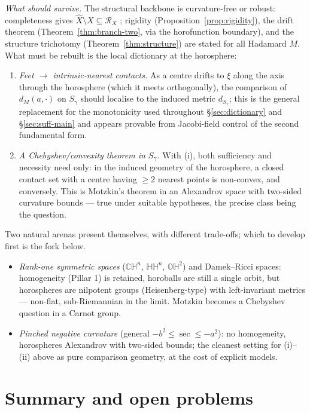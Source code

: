 \documentclass[11pt]{article}
\theoremstyle{remark}
\newcommand{\X}{X}
\newcommand{\Xhat}{\widehat{\X}}
\newcommand{\Rx}{\mathcal{R}_{\X}}
\begin{document}
\emph{What should survive.} The structural backbone is curvature-free
or robust: completeness gives $\Xhat\setminus\X\subseteq\Rx$
\cite[Thm.~3.1]{R1}; rigidity (Proposition~\ref{prop:rigidity}),
the drift theorem (Theorem~\ref{thm:branch-two}, via the horofunction
boundary), and the structure trichotomy
(Theorem~\ref{thm:structure}) are stated for all Hadamard $M$. What
must be rebuilt is the local dictionary at the horosphere:
\begin{enumerate}[label=(\roman*)]
\item \emph{Feet $\to$ intrinsic-nearest contacts.} As a centre drifts
to $\xi$ along the axis through the horosphere (which it meets
orthogonally), the comparison of $d_{M}(a,\cdot)$ on $S_{\gamma}$
should localise to the induced metric $d_{S_{\gamma}}$; this is the
general replacement for the monotonicity used throughout
\S\ref{sec:dictionary} and \S\ref{sec:suff-main} and appears provable from
Jacobi-field control of the second fundamental form.
\item \emph{A Chebyshev/convexity theorem in $S_{\gamma}$.} With (i),
both sufficiency and necessity need only: in the induced geometry of the
horosphere, a closed contact set with a centre having $\ge2$ nearest
points is non-convex, and conversely. This is Motzkin's
theorem in an Alexandrov space with two-sided curvature bounds ---
true under suitable hypotheses, the precise class being the question.
\end{enumerate}

Two natural arenas present themselves, with different trade-offs;
which to develop first is the fork below.
\begin{itemize}
\item \emph{Rank-one symmetric spaces} ($\mathbb{CH}^{n}$,
$\mathbb{HH}^{n}$, $\mathbb{OH}^{2}$) and Damek--Ricci spaces:
homogeneity (Pillar 1) is retained, horoballs are still a single
orbit, but horospheres are nilpotent groups (Heisenberg-type) with
left-invariant metrics --- non-flat, sub-Riemannian in the limit.
Motzkin becomes a Chebyshev question in a Carnot group.
\item \emph{Pinched negative curvature} (general $-b^{2}\le\sec\le
-a^{2}$): no homogeneity, horospheres Alexandrov with two-sided
bounds; the cleanest setting for (i)--(ii) above as pure comparison
geometry, at the cost of explicit models.
\end{itemize}

\section{Summary and open problems}\label{sec:summary}
\end{document}
